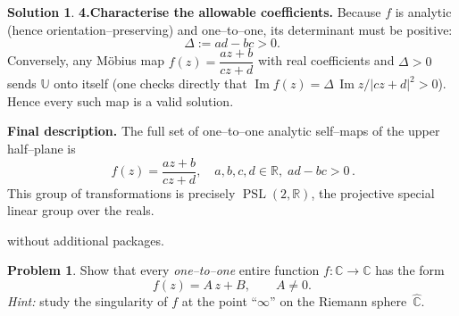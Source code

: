 \documentclass[12pt]{article}
\theoremstyle{definition} %
\newtheorem{solution}{Solution}
\newtheorem{problem}{Problem}
\theoremstyle{plain} %
\begin{document}
\begin{solution}
  \medskip
  \textbf{4.\;Characterise the allowable coefficients.}
  Because \(f\) is analytic (hence orientation–preserving)
  and one–to–one,
  its determinant must be positive:
  \[
     \Delta:=ad-bc>0.
  \]
  Conversely, any Möbius map
  \(
     f(z)=\dfrac{az+b}{cz+d}
  \)
  with real coefficients and \(\Delta>0\) sends $\mathbb{U}$ onto itself
  (one checks directly that
  \(\operatorname{Im}f(z)=\Delta\,\operatorname{Im}z/|cz+d|^{2}>0\)).
  Hence every such map is a valid solution.
  
  \medskip
  \textbf{Final description.}
  The full set of one–to–one analytic self–maps of the upper half–plane is
  \[
     \boxed{\,\displaystyle
     f(z)=\frac{az+b}{cz+d},
     \quad a,b,c,d\in\mathbb{R},\;
           ad-bc>0\, }.
  \]
  This group of transformations is precisely
  \( \operatorname{PSL}(2,\mathbb{R})\), the projective special linear group
  over the reals.
  \end{solution}
  
  without additional packages.
  \begin{problem}
    Show that every \emph{one–to–one} entire function $f:\mathbb{C}\to\mathbb{C}$ has the form  
    \[
       f(z)=A\,z+B, \qquad A\neq 0 .
    \]
    \emph{Hint:} study the singularity of $f$ at the point ``$\infty$'' on the Riemann sphere~$\widehat{\mathbb{C}}$.
    \end{problem}
    
\end{document}
